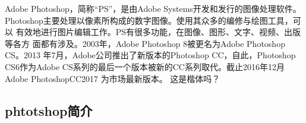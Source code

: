   Adobe Photoshop，简称“PS”，是由Adobe Systems开发和发行的图像处理软件。
 Photoshop主要处理以像素所构成的数字图像。使用其众多的编修与绘图工具，可以
 有效地进行图片编辑工作。PS有很多功能，在图像、图形、文字、视频、出版等各方
 面都有涉及。2003年，Adobe Photoshop 8被更名为Adobe Photoshop CS。2013
 年7月，Adobe公司推出了新版本的Photoshop CC，自此，Photoshop CS6作为Adobe
 CS系列的最后一个版本被新的CC系列取代。截止2016年12月Adobe PhotoshopCC2017
 为市场最新版本。
 {\kaishu 这是楷体吗？}
 
\subsection{phtotshop简介}
 \newpage